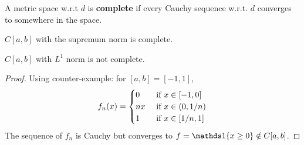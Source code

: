 \documentclass[11pt]{article}
\begin{document}
	\begin{definition}
		A metric space w.r.t $d$ is \textbf{complete} if every Cauchy sequence w.r.t. $d$ converges to somewhere in the space.
	\end{definition}
	
	\begin{example}
		$C[a, b]$ with the supremum norm is complete.
	\end{example}
	
	\begin{example}
		$C[a, b]$ with $L^1$ norm is not complete.
		\begin{proof}
			Using counter-example: for $[a, b] = [-1, 1]$,
			\begin{align}
				f_n(x) = \begin{cases}
					0 &\text{{ if }} x \in [-1, 0] \\
					nx & \text{{ if }} x \in(0, 1/n) \\
					1 &\text{{ if }} x \in [1/n, 1] \\
				\end{cases}
			\end{align}
			The sequence of $f_n$ is Cauchy but converges to $f = \id{x \geq 0} \notin C[a,b]$.
		\end{proof}
	\end{example}
	
\end{document}
